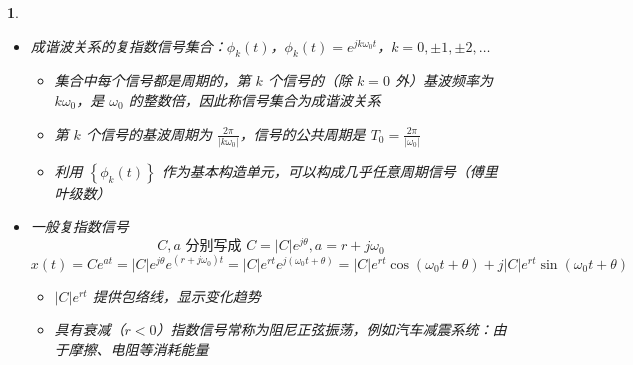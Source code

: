 \documentclass[UTF8]{report}
\theoremstyle{MyLineTheoremStyle} %
\theoremstyle{MyBlockTheoremStyle} %
\theoremstyle{MySubsubsectionStyle} %
\newtheorem{definition}{}
\begin{document}
\begin{definition}
\begin{itemize}
        \item 成谐波关系的复指数信号集合：$\phi_k(t)$，$\phi_k(t) = e^{jk\omega_0 t}$，$k = 0, \pm1, \pm2, \ldots$
        \begin{itemize}
            \item 集合中每个信号都是周期的，第 $k$ 个信号的（除 $k = 0$ 外）基波频率为 $k\omega_0$，是 $\omega_0$ 的整数倍，因此称信号集合为成谐波关系
            \item 第 $k$ 个信号的基波周期为 $\frac{2\pi}{|k\omega_0|}$，信号的公共周期是 $T_0 = \frac{2\pi}{|\omega_0|}$
            \item 利用 $\left\{\phi_k(t)\right\}$ 作为基本构造单元，可以构成几乎任意周期信号（傅里叶级数）
        \end{itemize}

        \item 一般复指数信号
        \[
        C, a \text{ 分别写成 } C = |C|e^{j\theta}, a = r + j\omega_0
        \]
        \[
        x(t) = Ce^{at} = |C| e^{j\theta} e^{(r + j\omega_0)t} = |C| e^{rt} e^{j(\omega_0 t + \theta)} = |C| e^{rt} \cos(\omega_0 t + \theta) + j |C| e^{rt} \sin(\omega_0 t + \theta)
        \]
        \begin{itemize}
            \item $|C| e^{rt}$ 提供包络线，显示变化趋势
            \item 具有衰减（$r < 0$）指数信号常称为阻尼正弦振荡，例如汽车减震系统：由于摩擦、电阻等消耗能量
        \end{itemize}
    \end{itemize}
\end{definition}
\end{document}
